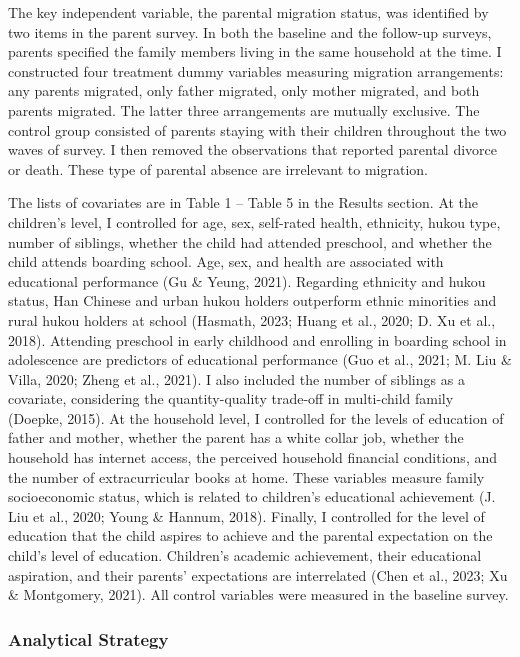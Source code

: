 \documentclass[
  man]{apa7}
\begin{document}
The key independent variable, the parental migration status, was identified by two items in the parent survey. In both the baseline and the follow-up surveys, parents specified the family members living in the same household at the time. I constructed four treatment dummy variables measuring migration arrangements: any parents migrated, only father migrated, only mother migrated, and both parents migrated. The latter three arrangements are mutually exclusive. The control group consisted of parents staying with their children throughout the two waves of survey. I then removed the observations that reported parental divorce or death. These type of parental absence are irrelevant to migration.

The lists of covariates are in Table 1 -- Table 5 in the Results section. At the children's level, I controlled for age, sex, self-rated health, ethnicity, hukou type, number of siblings, whether the child had attended preschool, and whether the child attends boarding school. Age, sex, and health are associated with educational performance (Gu \& Yeung, 2021). Regarding ethnicity and hukou status, Han Chinese and urban hukou holders outperform ethnic minorities and rural hukou holders at school (Hasmath, 2023; Huang et al., 2020; D. Xu et al., 2018). Attending preschool in early childhood and enrolling in boarding school in adolescence are predictors of educational performance (Guo et al., 2021; M. Liu \& Villa, 2020; Zheng et al., 2021). I also included the number of siblings as a covariate, considering the quantity-quality trade-off in multi-child family (Doepke, 2015). At the household level, I controlled for the levels of education of father and mother, whether the parent has a white collar job, whether the household has internet access, the perceived household financial conditions, and the number of extracurricular books at home. These variables measure family socioeconomic status, which is related to children's educational achievement (J. Liu et al., 2020; Young \& Hannum, 2018). Finally, I controlled for the level of education that the child aspires to achieve and the parental expectation on the child's level of education. Children's academic achievement, their educational aspiration, and their parents' expectations are interrelated (Chen et al., 2023; Xu \& Montgomery, 2021). All control variables were measured in the baseline survey.

\hypertarget{analytical-strategy}{%
\subsubsection{Analytical Strategy}\label{analytical-strategy}}
\end{document}
